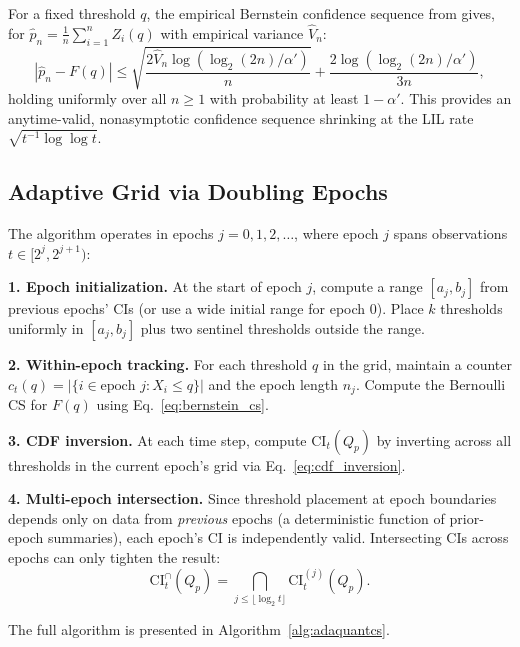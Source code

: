 \documentclass{article}
\newcommand{\Qp}{Q_p}
\newcommand{\CI}{\mathrm{CI}}
\begin{document}
For a fixed threshold $q$, the empirical Bernstein confidence sequence from \citet{howard2021time} gives, for $\hat{p}_n = \frac{1}{n}\sum_{i=1}^n Z_i(q)$ with empirical variance $\hat{V}_n$:
\begin{equation}
    |\hat{p}_n - F(q)| \leq \sqrt{\frac{2\hat{V}_n \log(\log_2(2n)/\alpha')}{n}} + \frac{2\log(\log_2(2n)/\alpha')}{3n},
    \label{eq:bernstein_cs}
\end{equation}
holding uniformly over all $n \geq 1$ with probability at least $1 - \alpha'$. This provides an anytime-valid, nonasymptotic confidence sequence shrinking at the LIL rate $\sqrt{t^{-1}\log\log t}$.

\subsection{Adaptive Grid via Doubling Epochs}

The algorithm operates in epochs $j = 0, 1, 2, \ldots$, where epoch $j$ spans observations $t \in [2^j, 2^{j+1})$:

\textbf{1. Epoch initialization.} At the start of epoch $j$, compute a range $[a_j, b_j]$ from previous epochs' CIs (or use a wide initial range for epoch $0$). Place $k$ thresholds uniformly in $[a_j, b_j]$ plus two sentinel thresholds outside the range.

\textbf{2. Within-epoch tracking.} For each threshold $q$ in the grid, maintain a counter $c_t(q) = |\{i \in \text{epoch } j : X_i \leq q\}|$ and the epoch length $n_j$. Compute the Bernoulli CS for $F(q)$ using Eq.~\eqref{eq:bernstein_cs}.

\textbf{3. CDF inversion.} At each time step, compute $\CI_t(\Qp)$ by inverting across all thresholds in the current epoch's grid via Eq.~\eqref{eq:cdf_inversion}.

\textbf{4. Multi-epoch intersection.} Since threshold placement at epoch boundaries depends only on data from \emph{previous} epochs (a deterministic function of prior-epoch summaries), each epoch's CI is independently valid. Intersecting CIs across epochs can only tighten the result:
\begin{equation}
    \CI_t^{\cap}(\Qp) = \bigcap_{j \leq \lfloor\log_2 t\rfloor} \CI_t^{(j)}(\Qp).
    \label{eq:intersection}
\end{equation}

The full algorithm is presented in Algorithm~\ref{alg:adaquantcs}.
\end{document}
